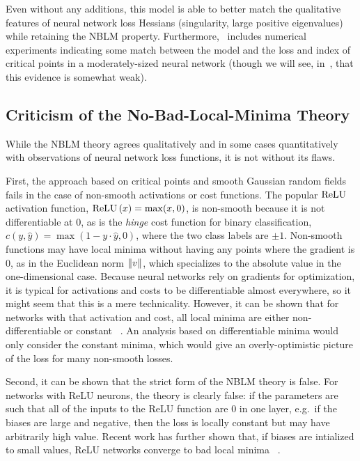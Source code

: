 \documentclass[../../thesis.tex]{subfiles}
\begin{document}
Even without any additions,
this model is able to better match the qualitative features of
neural network loss Hessians
(singularity, large positive eigenvalues)
while retaining the NBLM property.
Furthermore,~\cite{pennington2017}
includes numerical experiments indicating
some match between the model and the loss and index
of critical points in a moderately-sized neural network
(though we will see, in~,
that this evidence is somewhat weak).

\subsection{Criticism of the No-Bad-Local-Minima Theory}

While the NBLM theory agrees qualitatively and in some cases quantitatively
with observations of neural network loss functions,
it is not without its flaws.

First, the approach based on critical points
and smooth Gaussian random fields fails
in the case of non-smooth activations or cost functions.
The popular $\mathrm{ReLU}$ activation function,
$\mathrm{ReLU}\left(x\right) = \max(x, 0)$,
is non-smooth because it is not differentiable at $0$,
as is the \emph{hinge} cost function for binary classification,
$c(y, \hat{y}) = \max(1-y\cdot\hat{y}, 0)$,
where the two class labels are $\pm 1$.
Non-smooth functions may have local minima
without having any points where the gradient is $0$,
as in the Euclidean norm $\lVert v\rVert$,
which specializes to the absolute value in the one-dimensional case.
Because neural networks rely on gradients for optimization,
it is typical for activations and costs
to be differentiable almost everywhere,
so it might seem that this is a mere technicality.
However, it can be shown that for networks
with that activation and cost,
all local minima are either non-differentiable or constant%
~\cite{laurent2017}.
An analysis based on differentiable minima would only
consider the constant minima,
which would give an overly-optimistic picture
of the loss for many non-smooth losses.

Second,
it can be shown that the strict form of the NBLM theory is false.
For networks with ReLU neurons, the theory is clearly false:
if the parameters are such that all of the inputs to the
ReLU function are $0$ in one layer,
e.g.~if the biases are large and negative,
then the loss is locally constant
but may have arbitrarily high value.
Recent work has further shown that,
if biases are intialized to small values,
ReLU networks converge to bad local minima%
~\cite{holzmller2020}.
\end{document}
